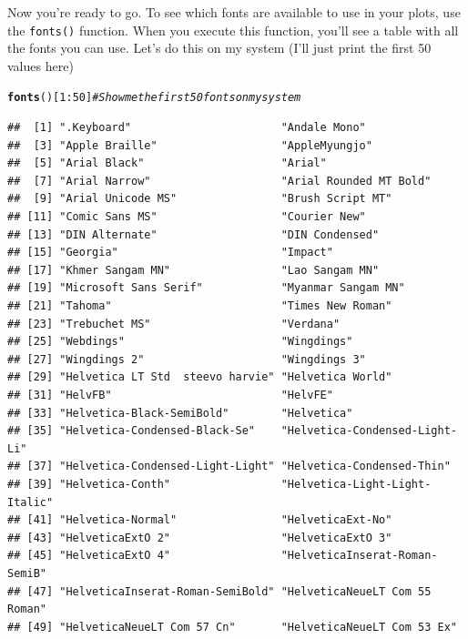 \documentclass{tufte-book}\usepackage[]{graphicx}\usepackage[]{color}
\makeatletter
\newcommand{\hlnum}[1]{\textcolor[rgb]{0.686,0.059,0.569}{#1}}%
\newcommand{\hlcom}[1]{\textcolor[rgb]{0.678,0.584,0.686}{\textit{#1}}}%
\newcommand{\hlopt}[1]{\textcolor[rgb]{0,0,0}{#1}}%
\newcommand{\hlstd}[1]{\textcolor[rgb]{0.345,0.345,0.345}{#1}}%
\newcommand{\hlkwd}[1]{\textcolor[rgb]{0.737,0.353,0.396}{\textbf{#1}}}%
\newenvironment{kframe}{%
 \def\at@end@of@kframe{}%
 \ifinner\ifhmode%
  \def\at@end@of@kframe{\end{minipage}}%
  \begin{minipage}{\columnwidth}%
 \fi\fi%
 \def\FrameCommand##1{\hskip\@totalleftmargin \hskip-\fboxsep
 \colorbox{shadecolor}{##1}\hskip-\fboxsep
     \hskip-\linewidth \hskip-\@totalleftmargin \hskip\columnwidth}%
 \MakeFramed {\advance\hsize-\width
   \@totalleftmargin\z@ \linewidth\hsize
   \@setminipage}}%
 {\par\unskip\endMakeFramed%
 \at@end@of@kframe}
\newenvironment{knitrout}{}{} %
\makeatother
\begin{document}
\begin{footnotesize}
Now you're ready to go. To see which fonts are available to use in your plots, use the \texttt{fonts()} function. When you execute this function, you'll see a table with all the fonts you can use. Let's do this on my system (I'll just print the first 50 values here)

\begin{tiny}
\begin{knitrout}
\color{fgcolor}\begin{kframe}
\begin{alltt}
\hlkwd{fonts}\hlstd{()[}\hlnum{1}\hlopt{:}\hlnum{50}\hlstd{]} \hlcom{# Show me the first 50 fonts on my system}
\end{alltt}
\begin{verbatim}
##  [1] ".Keyboard"                       "Andale Mono"                    
##  [3] "Apple Braille"                   "AppleMyungjo"                   
##  [5] "Arial Black"                     "Arial"                          
##  [7] "Arial Narrow"                    "Arial Rounded MT Bold"          
##  [9] "Arial Unicode MS"                "Brush Script MT"                
## [11] "Comic Sans MS"                   "Courier New"                    
## [13] "DIN Alternate"                   "DIN Condensed"                  
## [15] "Georgia"                         "Impact"                         
## [17] "Khmer Sangam MN"                 "Lao Sangam MN"                  
## [19] "Microsoft Sans Serif"            "Myanmar Sangam MN"              
## [21] "Tahoma"                          "Times New Roman"                
## [23] "Trebuchet MS"                    "Verdana"                        
## [25] "Webdings"                        "Wingdings"                      
## [27] "Wingdings 2"                     "Wingdings 3"                    
## [29] "Helvetica LT Std  steevo harvie" "Helvetica World"                
## [31] "HelvFB"                          "HelvFE"                         
## [33] "Helvetica-Black-SemiBold"        "Helvetica"                      
## [35] "Helvetica-Condensed-Black-Se"    "Helvetica-Condensed-Light-Li"   
## [37] "Helvetica-Condensed-Light-Light" "Helvetica-Condensed-Thin"       
## [39] "Helvetica-Conth"                 "Helvetica-Light-Light-Italic"   
## [41] "Helvetica-Normal"                "HelveticaExt-No"                
## [43] "HelveticaExtO 2"                 "HelveticaExtO 3"                
## [45] "HelveticaExtO 4"                 "HelveticaInserat-Roman-SemiB"   
## [47] "HelveticaInserat-Roman-SemiBold" "HelveticaNeueLT Com 55 Roman"   
## [49] "HelveticaNeueLT Com 57 Cn"       "HelveticaNeueLT Com 53 Ex"
\end{verbatim}
\end{kframe}
\end{knitrout}
\end{tiny}


\end{footnotesize}
\end{document}
